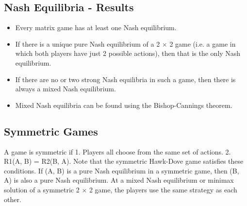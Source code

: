 \documentclass[]{report}
\begin{document}
	\subsection{Nash Equilibria - Results}
	\begin{itemize}
		\item Every matrix game has at least one Nash equilibrium.
		\item If there is a unique pure Nash equilibrium of a 2 × 2 game (i.e. a
		game in which both players have just 2 possible actions), then that
		is the only Nash equilibrium.
		\item If there are no or two strong Nash equilibria in such a game, then
		there is always a mixed Nash equilibrium.
		\item Mixed Nash equilibria can be found using the Bishop-Cannings
		theorem.
	\end{itemize}
	
	\subsection{Symmetric Games}
	A game is symmetric if
	1. Players all choose from the same set of actions.
	2. R1(A, B) = R2(B, A).
	Note that the symmetric Hawk-Dove game satisfies these
	conditions.
	If (A, B) is a pure Nash equilibrium in a symmetric game, then
	(B, A) is also a pure Nash equilibrium.
	At a mixed Nash equilibrium or minimax solution of a symmetric
	2 × 2 game, the players use the same strategy as each other.
\end{document}
